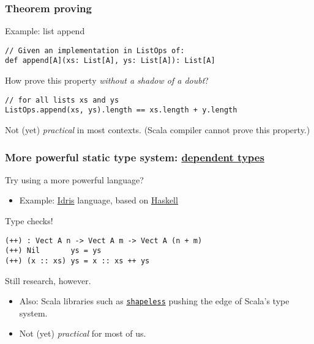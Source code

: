 \begin{frame}[fragile]
  \frametitle{Theorem proving}

  \begin{block}{Example: list append}
    \begin{verbatim}
// Given an implementation in ListOps of:
def append[A](xs: List[A], ys: List[A]): List[A]
    \end{verbatim}
  \end{block}

  \begin{block}{How prove this property \emph{without a shadow of a doubt}?}
    \begin{verbatim}
// for all lists xs and ys
ListOps.append(xs, ys).length == xs.length + y.length
    \end{verbatim}
  \end{block}

  \begin{block}{Not (yet) \emph{practical} in most contexts.}
    (Scala compiler cannot prove this property.)
  \end{block}
\end{frame}

\begin{frame}[fragile]
  \frametitle{More powerful static type system: \href{http://en.wikipedia.org/wiki/Dependent\_type}{dependent types}}

  \begin{block}{Try using a more powerful language?}
    \begin{itemize}
      \item Example: \href{http://idris-lang.org/}{Idris} language, based on \href{http://haskell.org/}{Haskell}
    \end{itemize}
  \end{block}

  \begin{block}{Type checks!}
    \begin{verbatim}
(++) : Vect A n -> Vect A m -> Vect A (n + m)
(++) Nil       ys = ys
(++) (x :: xs) ys = x :: xs ++ ys
    \end{verbatim}
  \end{block}

  \begin{block}{Still research, however.}
    \begin{itemize}
      \item Also: Scala libraries such as \href{https://github.com/milessabin/shapeless}{\texttt{shapeless}} pushing the edge of Scala's type system.
      \item Not (yet) \emph{practical} for most of us.
    \end{itemize}
  \end{block}
\end{frame}

